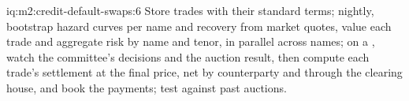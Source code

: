 \begin{solution}{iq:m2:credit-default-swaps:6}
Store trades with their standard terms; nightly, bootstrap hazard curves per name and
recovery from market quotes, value each trade and aggregate risk by name and tenor, in
parallel across names; on a , watch the committee's decisions and the
auction result, then compute each trade's settlement at the final price, net by
counterparty and through the clearing house, and book the payments; test against
past auctions.
\end{solution}
